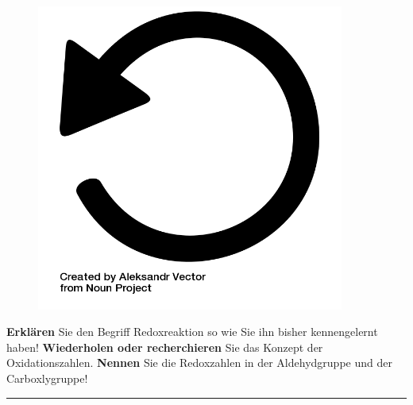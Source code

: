 \documentclass{scrartcl}  %
\begin{document}
\vspace{0.3cm}
		\begin{tcolorbox}[enhanced,
			colback=white,
			colframe=orange!60!red,
			fonttitle=\sffamily\bfseries\large, 
			title=Vorüberlegung,  %
			attach boxed title to top left={xshift=3.2mm,yshift=-0.50mm},
			boxed title style={skin=enhancedfirst jigsaw,size=small,arc=1mm,bottom=-1mm,colframe=orange!60!red,height=0.75cm},
			colbacktitle=orange!60!red,
			drop lifted shadow]	
			\begin{figure}  
				\centering
				\vspace{-14pt}  %
				\includegraphics[width=0.9\textwidth]{symbols/symbol_tex_review}
			\end{figure}
			
			\textbf{Erklären} Sie den Begriff Redoxreaktion so wie Sie ihn bisher kennengelernt haben! \newline
			\textbf{Wiederholen oder recherchieren} Sie das Konzept der Oxidationszahlen. \newline
			\textbf{Nennen} Sie die Redoxzahlen in der Aldehydgruppe und der Carboxlygruppe!
			\vspace{1cm}			
		\end{tcolorbox}
		\begin{center}
			\noindent\rule{18cm}{0.1pt}
		\end{center}
\end{document}
